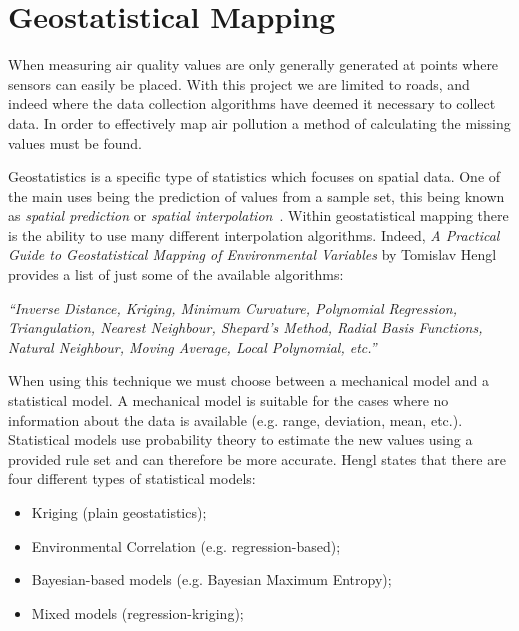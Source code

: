 \section{Geostatistical Mapping}\label{geostatistics}



When measuring air quality values are only generally generated at points where sensors can easily be placed. With this project we are limited to roads, and indeed where the data collection algorithms have deemed it necessary to collect data. In order to effectively map air pollution a method of calculating the missing values must be found.

Geostatistics is a specific type of statistics which focuses on spatial data. One of the main uses being the prediction of values from a sample set, this being known as \emph{spatial prediction} or \emph{spatial interpolation}~\cite{practicalguidestatisticalmapping}. Within geostatistical mapping there is the ability to use many different interpolation algorithms. Indeed, \emph{A Practical Guide to Geostatistical Mapping of Environmental Variables} by Tomislav Hengl provides a list of just some of the available algorithms: 

\emph{``Inverse Distance, Kriging, Minimum Curvature, Polynomial Regression, Triangulation, Nearest Neighbour, Shepard’s Method, Radial Basis Functions, Natural Neighbour, Moving Average, Local Polynomial, etc.''}

When using this technique we must choose between a mechanical model and a statistical model. A mechanical model is suitable for the cases where no information about the data is available (e.g. range, deviation, mean, etc.). Statistical models use probability theory to estimate the new values using a provided rule set and can therefore be more accurate. Hengl states that there are four different types of statistical models:

	\begin{itemize}
		\item Kriging (plain geostatistics);
		\item Environmental Correlation (e.g. regression-based); 
		\item Bayesian-based models (e.g. Bayesian Maximum Entropy); 
		\item Mixed models (regression-kriging);
	\end{itemize}

